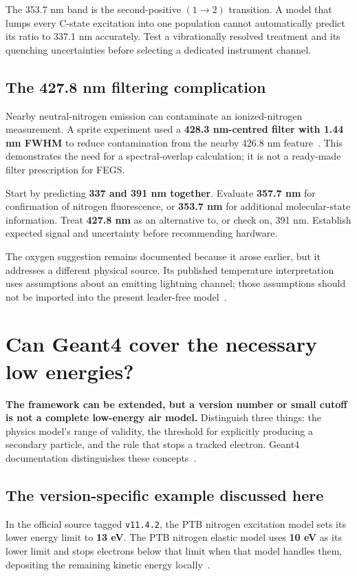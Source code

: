 \documentclass[11pt,a4paper]{article}
\newcommand{\xu}[1]{\cite[#1]{Xu2015}}
\newcommand{\nextsection}[1]{\clearpage\section{#1}}
\begin{document}
The 353.7 nm band is the second-positive $(1\!\rightarrow\!2)$ transition. A model that lumps every C-state excitation into one population cannot automatically predict its ratio to 337.1 nm accurately. Test a vibrationally resolved treatment and its quenching uncertainties before selecting a dedicated instrument channel.\xu{Table~1; Sec.~2.2}

\subsection*{The 427.8 nm filtering complication}
Nearby neutral-nitrogen emission can contaminate an ionized-nitrogen measurement. A sprite experiment used a \textbf{428.3 nm-centred filter with 1.44 nm FWHM} to reduce contamination from the nearby 426.8 nm feature~\cite{Heavner2010}. This demonstrates the need for a spectral-overlap calculation; it is not a ready-made filter prescription for FEGS.

\begin{keybox}
Start by predicting \textbf{337 and 391 nm together}. Evaluate \textbf{357.7 nm} for confirmation of nitrogen fluorescence, or \textbf{353.7 nm} for additional molecular-state information. Treat \textbf{427.8 nm} as an alternative to, or check on, 391 nm. Establish expected signal and uncertainty before recommending hardware.
\end{keybox}

The oxygen suggestion remains documented because it arose earlier, but it addresses a different physical source. Its published temperature interpretation uses assumptions about an emitting lightning channel; those assumptions should not be imported into the present leader-free model~\cite{Boggs2021}.

\nextsection{Can Geant4 cover the necessary low energies?}
\label{sec:geant}
\textbf{The framework can be extended, but a version number or small cutoff is not a complete low-energy air model.} Distinguish three things: the physics model's range of validity, the threshold for explicitly producing a secondary particle, and the rule that stops a tracked electron. Geant4 documentation distinguishes these concepts~\cite{G4Cuts,G4DNA}.

\subsection*{The version-specific example discussed here}
In the official source tagged \texttt{v11.4.2}, the PTB nitrogen excitation model sets its lower energy limit to \textbf{13 eV}. The PTB nitrogen elastic model uses \textbf{10 eV} as its lower limit and stops electrons below that limit when that model handles them, depositing the remaining kinetic energy locally~\cite{G4PTBExc,G4PTBEl}.
\end{document}
